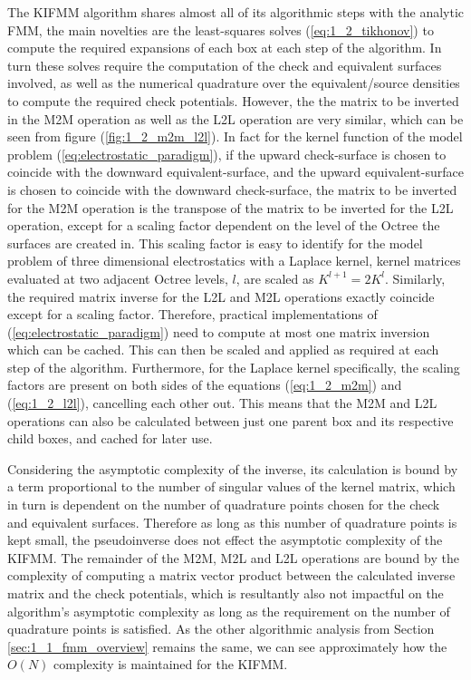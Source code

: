 The \gls{KIFMM} algorithm shares almost all of its algorithmic steps with the analytic \gls{FMM}, the
main novelties are the least-squares solves (\ref{eq:1_2_tikhonov}) to compute
the required expansions of each box at each step of the algorithm. In turn
these solves require the computation of the check and equivalent surfaces involved,
as well as the numerical quadrature over the equivalent/source densities to compute
the required check potentials. However, the the matrix to be inverted
in the \gls{M2M} operation as well as the \gls{L2L} operation are very similar, which can
be seen from figure (\ref{fig:1_2_m2m_l2l}). In fact for the kernel function of
the model problem (\ref{eq:electrostatic_paradigm}), if
the upward \gls{check-surface} is chosen to coincide with the downward
\gls{equivalent-surface}, and the upward \gls{equivalent-surface} is chosen to
coincide with the downward \gls{check-surface}, the matrix to be inverted for the M2M
operation is the transpose of the matrix to be inverted for the \gls{L2L} operation,
except for a scaling factor dependent on the level of the Octree the surfaces
are created in. This scaling factor is easy to identify for the model problem of
three dimensional electrostatics with a Laplace kernel,
kernel matrices evaluated at two adjacent Octree levels, $l$, are scaled as $K^{l+1} = 2K^l$.
Similarly, the required matrix inverse for the \gls{L2L} and \gls{M2L} operations exactly coincide
except for a scaling factor. Therefore, practical implementations of (\ref{eq:electrostatic_paradigm})
need to compute at most one matrix inversion which can be cached. This can then
be scaled and applied as required at each step of the algorithm. Furthermore,
for the Laplace kernel specifically, the scaling factors are present on both sides
of the equations (\ref{eq:1_2_m2m}) and (\ref{eq:1_2_l2l}), cancelling each other out.
This means that the \gls{M2M} and \gls{L2L} operations can also be calculated between just one
parent box and its respective child boxes, and cached for later use.

Considering the asymptotic complexity of the inverse, its calculation is bound
by a term proportional to the number of singular values of the kernel
matrix, which in turn is dependent on the number of quadrature points chosen for
the check and equivalent surfaces. Therefore as long as this number of quadrature
points is kept small, the pseudoinverse does not effect the asymptotic complexity
of the \gls{KIFMM}. The remainder of the \gls{M2M}, \gls{M2L} and \gls{L2L} operations are bound by
the complexity of computing a matrix vector product between the calculated inverse
matrix and the check potentials, which is resultantly also not impactful on the
algorithm's asymptotic complexity as long as the requirement on the number of
quadrature points is satisfied. As the other algorithmic analysis from
Section \ref{sec:1_1_fmm_overview} remains the same, we can see approximately how
the $O(N)$ complexity is maintained for the \gls{KIFMM}.

